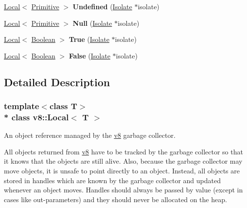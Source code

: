 \begin{DoxyCompactItemize}
\item 
\hyperlink{classv8_1_1_local}{Local}$<$ \hyperlink{classv8_1_1_primitive}{Primitive} $>$ {\bfseries Undefined} (\hyperlink{classv8_1_1_isolate}{Isolate} $\ast$isolate)\hypertarget{classv8_1_1_local_a696a04c5f02bf0aeedd1e5a539587de4}{}\label{classv8_1_1_local_a696a04c5f02bf0aeedd1e5a539587de4}

\item 
\hyperlink{classv8_1_1_local}{Local}$<$ \hyperlink{classv8_1_1_primitive}{Primitive} $>$ {\bfseries Null} (\hyperlink{classv8_1_1_isolate}{Isolate} $\ast$isolate)\hypertarget{classv8_1_1_local_a6a29184b023bde58d4af2bba2d249a35}{}\label{classv8_1_1_local_a6a29184b023bde58d4af2bba2d249a35}

\item 
\hyperlink{classv8_1_1_local}{Local}$<$ \hyperlink{classv8_1_1_boolean}{Boolean} $>$ {\bfseries True} (\hyperlink{classv8_1_1_isolate}{Isolate} $\ast$isolate)\hypertarget{classv8_1_1_local_aa5944f05409b5572b14793eff33a7908}{}\label{classv8_1_1_local_aa5944f05409b5572b14793eff33a7908}

\item 
\hyperlink{classv8_1_1_local}{Local}$<$ \hyperlink{classv8_1_1_boolean}{Boolean} $>$ {\bfseries False} (\hyperlink{classv8_1_1_isolate}{Isolate} $\ast$isolate)\hypertarget{classv8_1_1_local_ae8e414a3a8b3e1f2fa60c24e4dda0c4a}{}\label{classv8_1_1_local_ae8e414a3a8b3e1f2fa60c24e4dda0c4a}

\end{DoxyCompactItemize}


\subsection{Detailed Description}
\subsubsection*{template$<$class T$>$\\*
class v8\+::\+Local$<$ T $>$}

An object reference managed by the \hyperlink{namespacev8}{v8} garbage collector.

All objects returned from \hyperlink{namespacev8}{v8} have to be tracked by the garbage collector so that it knows that the objects are still alive. Also, because the garbage collector may move objects, it is unsafe to point directly to an object. Instead, all objects are stored in handles which are known by the garbage collector and updated whenever an object moves. Handles should always be passed by value (except in cases like out-\/parameters) and they should never be allocated on the heap.

